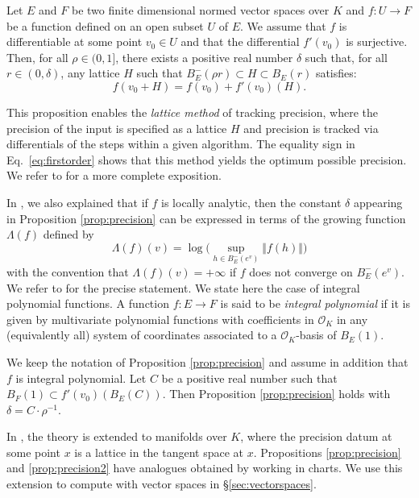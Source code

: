 \documentclass{sig-alternate-2013}
\renewcommand{\O}{\mathcal O}
\newcommand{\OK}{\mathcal{O}_K}
\begin{document}
\begin{prop}
\label{prop:precision}
Let $E$ and $F$ be two finite dimensional normed vector spaces over $K$ 
and $f : U \rightarrow F$ be a function defined on an open subset $U$ of 
$E$. We assume that $f$ is differentiable at some point $v_0 \in U$ and 
that the differential $f'(v_0)$ is surjective.
Then, for all $\rho \in (0, 1]$, there exists a positive real
number $\delta$ such that, for all $r \in (0, \delta)$, any lattice
$H$ such that $B^-_E(\rho r) \subset H \subset B^{\phantom -}_E(r)$ 
satisfies:
\begin{equation}
\label{eq:firstorder}
f(v_0 + H) = f(v_0) + f'(v_0) (H).
\end{equation}
\end{prop}

This proposition enables the \emph{lattice method} of tracking precision,
where the precision of the input is specified as a lattice $H$ and precision
is tracked via differentials of the steps within a given algorithm.
The equality sign in Eq.~\eqref{eq:firstorder} shows that this method
yields the optimum possible precision. 
We refer to \cite[\S 4.1]{caruso-roe-vaccon:14a} for a more complete 
exposition.

In \cite{caruso-roe-vaccon:14a}, we also explained that if 
$f$ is locally analytic, then the constant $\delta$ appearing in
Proposition \ref{prop:precision} can be expressed in terms of the
growing function $\Lambda(f)$ defined by
\[
\textstyle \Lambda(f)(v) = 
\log \big( \sup_{h \in B^-_E(e^v)} \Vert 
f(h) \Vert \big)
\]
with the convention that $\Lambda(f)(v) = +\infty$ if $f$ does not
converge on $B^-_E(e^v)$.
We refer to \cite[Proposition 3.12]{caruso-roe-vaccon:14a} for the
precise statement.  We state here the case of
integral polynomial functions. A function $f : E \to F$ is said to be
\emph{integral polynomial} if it is given by multivariate polynomial 
functions with coefficients in $\O_K$ in any (equivalently all) system 
of coordinates associated to a $\OK$-basis of $B_E(1)$.

\begin{prop}
\label{prop:precision2}
We keep the notation of Proposition \ref{prop:precision} and assume 
in addition that $f$ is integral polynomial. Let $C$ be a positive real
number such that $B_F(1) \subset f'(v_0)(B_E(C))$. 
Then Proposition \ref{prop:precision} holds with $\delta = C \cdot
\rho^{-1}$.
\end{prop}

In \cite[Appendix A]{caruso-roe-vaccon:14a}, the theory is extended 
to manifolds over $K$, where the precision 
datum at some point $x$ is a lattice in the tangent space at $x$. 
Propositions \ref{prop:precision} and \ref{prop:precision2} have
analogues obtained by working in charts.  We use this extension
to compute with vector spaces in \S \ref{sec:vectorspaces}.
\end{document}
